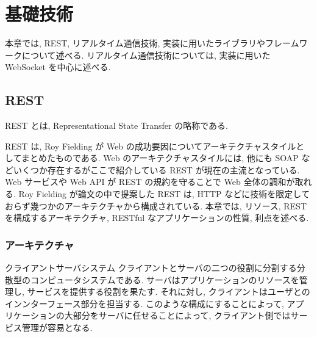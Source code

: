 \documentclass[a4j, 10pt, twocolumn]{ujarticle}
\begin{document}
    
    \section{基礎技術}
    本章では, REST, リアルタイム通信技術, 実装に用いたライブラリやフレームワークについて述べる. リアルタイム通信技術については, 実装に用いた WebSocket を中心に述べる.
    \subsection{REST}
   
    REST とは, Representational State Transfer の略称である.

    REST は, Roy Fielding が Web の成功要因についてアーキテクチャスタイルとしてまとめたものである. Web のアーキテクチャスタイルには, 他にも SOAP などいくつか存在するがここで紹介している REST が現在の主流となっている. Web サービスや Web API が REST の規約を守ることで Web 全体の調和が取れる. Roy Fielding が論文の中で提案した REST は, HTTP などに技術を限定しておらず幾つかのアーキテクチャから構成されている. 本章では, リソース, REST を構成するアーキテクチャ, RESTful なアプリケーションの性質, 利点を述べる.\cite{restful_book}

    \subsubsection{アーキテクチャ}
    クライアントサーバシステム
    クライアントとサーバの二つの役割に分割する分散型のコンピュータシステムである. サーバはアプリケーションのリソースを管理し, サービスを提供する役割を果たす. それに対し, クライアントはユーザとのインンターフェース部分を担当する. このような構成にすることによって,  アプリケーションの大部分をサーバに任せることによって, クライアント側ではサービス管理が容易となる.
\end{document}
